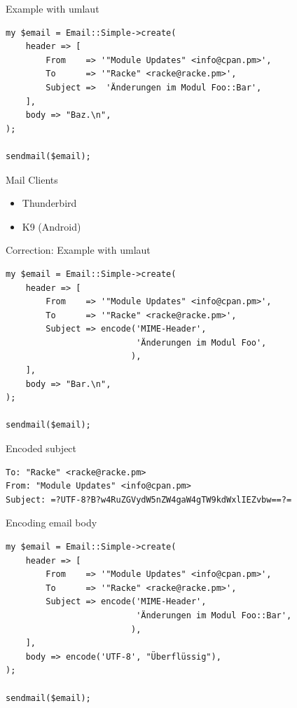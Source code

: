 \begin{frame}[fragile]{Example with umlaut}
  \begin{verbatim}
my $email = Email::Simple->create(
    header => [
        From    => '"Module Updates" <info@cpan.pm>',
        To      => '"Racke" <racke@racke.pm>',
        Subject =>  'Änderungen im Modul Foo::Bar',
    ],
    body => "Baz.\n",
);

sendmail($email);
  \end{verbatim}
\end{frame}

\begin{frame}[fragile]{Mail Clients}

  \begin{itemize}
  \item[\goodsmile] Thunderbird
  \item[\sadsmile] K9 (Android)
  \end{itemize}

\end{frame}

\begin{frame}[fragile]{Correction: Example with umlaut}
  \begin{verbatim}
my $email = Email::Simple->create(
    header => [
        From    => '"Module Updates" <info@cpan.pm>',
        To      => '"Racke" <racke@racke.pm>',
        Subject => encode('MIME-Header', 
                          'Änderungen im Modul Foo',
                         ),
    ],
    body => "Bar.\n",
);

sendmail($email);
  \end{verbatim}
\end{frame}

\begin{frame}[fragile]{Encoded subject}
  \begin{lstlisting}
To: "Racke" <racke@racke.pm>
From: "Module Updates" <info@cpan.pm>
Subject: =?UTF-8?B?w4RuZGVydW5nZW4gaW4gTW9kdWxlIEZvbw==?=
\end{lstlisting}
\end{frame}

\begin{frame}[fragile]{Encoding email body}
  \begin{verbatim}
my $email = Email::Simple->create(
    header => [
        From    => '"Module Updates" <info@cpan.pm>',
        To      => '"Racke" <racke@racke.pm>',
        Subject => encode('MIME-Header',
                          'Änderungen im Modul Foo::Bar',
                         ),
    ],
    body => encode('UTF-8', "Überflüssig"),
);

sendmail($email);
  \end{verbatim}
\end{frame}

